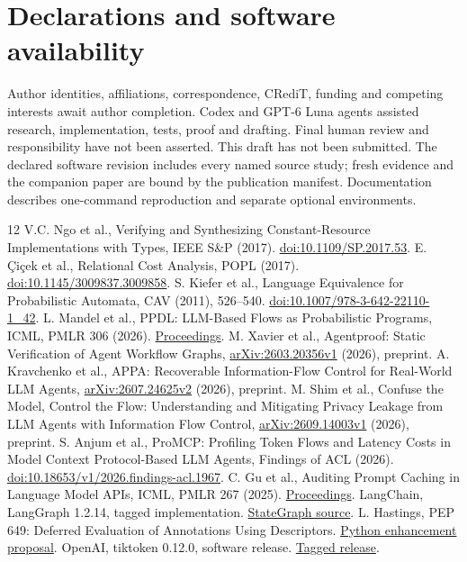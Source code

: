 \documentclass[preprint,12pt,a4paper]{elsarticle}
\begin{document}
\section*{Declarations and software availability}
Author identities, affiliations, correspondence, CRediT, funding and competing interests await author completion. Codex and GPT-6 Luna agents assisted research, implementation, tests, proof and drafting. Final human review and responsibility have not been asserted. This draft has not been submitted. The declared software revision includes every named source study; fresh evidence and the companion paper are bound by the publication manifest. Documentation describes one-command reproduction and separate optional environments.



\begingroup\small\raggedright
\setlength{\bibsep}{3pt}
\begin{thebibliography}{12}
 V.C. Ngo et al., Verifying and Synthesizing Constant-Resource Implementations with Types, IEEE S\&P (2017). \href{https://doi.org/10.1109/SP.2017.53}{doi:10.1109/SP.2017.53}.
 E. \c{C}i\c{c}ek et al., Relational Cost Analysis, POPL (2017). \href{https://doi.org/10.1145/3009837.3009858}{doi:10.1145/3009837.3009858}.
 S. Kiefer et al., Language Equivalence for Probabilistic Automata, CAV (2011), 526--540. \href{https://doi.org/10.1007/978-3-642-22110-1_42}{doi:10.1007/978-3-642-22110-1\_42}.
 L. Mandel et al., PPDL: LLM-Based Flows as Probabilistic Programs, ICML, PMLR 306 (2026). \href{https://proceedings.mlr.press/v306/mandel26a.html}{Proceedings}.
 M. Xavier et al., Agentproof: Static Verification of Agent Workflow Graphs, \href{https://arxiv.org/abs/2603.20356v1}{arXiv:2603.20356v1} (2026), preprint.
 A. Kravchenko et al., APPA: Recoverable Information-Flow Control for Real-World LLM Agents, \href{https://arxiv.org/abs/2607.24625v2}{arXiv:2607.24625v2} (2026), preprint.
 M. Shim et al., Confuse the Model, Control the Flow: Understanding and Mitigating Privacy Leakage from LLM Agents with Information Flow Control, \href{https://arxiv.org/abs/2609.14003v1}{arXiv:2609.14003v1} (2026), preprint.
 S. Anjum et al., ProMCP: Profiling Token Flows and Latency Costs in Model Context Protocol-Based LLM Agents, Findings of ACL (2026). \href{https://doi.org/10.18653/v1/2026.findings-acl.1967}{doi:10.18653/v1/2026.findings-acl.1967}.
 C. Gu et al., Auditing Prompt Caching in Language Model APIs, ICML, PMLR 267 (2025). \href{https://proceedings.mlr.press/v267/gu25b.html}{Proceedings}.
 LangChain, LangGraph 1.2.14, tagged implementation. \href{https://github.com/langchain-ai/langgraph/blob/1.2.14/libs/langgraph/langgraph/graph/state.py}{StateGraph source}.
 L. Hastings, PEP 649: Deferred Evaluation of Annotations Using Descriptors. \href{https://peps.python.org/pep-0649/}{Python enhancement proposal}.
 OpenAI, tiktoken 0.12.0, software release. \href{https://github.com/openai/tiktoken/releases/tag/0.12.0}{Tagged release}.
\end{thebibliography}
\endgroup
\end{document}
